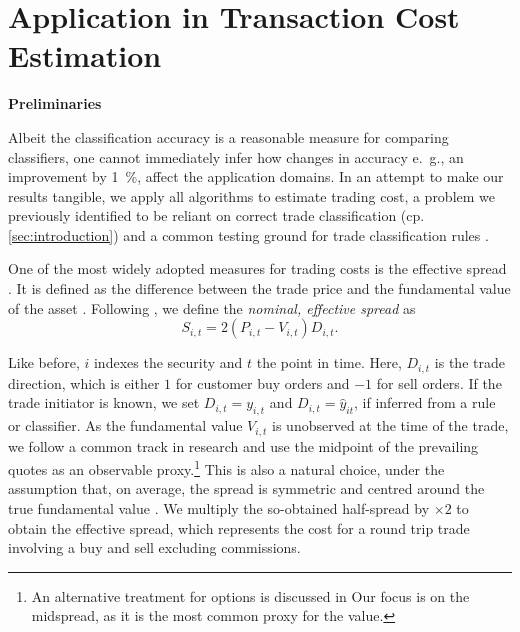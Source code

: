 \clearpage

\section{Application in Transaction Cost Estimation}\label{sec:application}

\textbf{Preliminaries}

Albeit the classification accuracy is a reasonable measure for comparing classifiers, one cannot immediately infer how changes in accuracy e.~g., an improvement by \SI{1}{\percent}, affect the application domains. In an attempt to make our results tangible, we apply all algorithms to estimate trading cost, a problem we previously identified to be reliant on correct trade classification (cp. \cref{sec:introduction}) and a common testing ground for trade classification rules \autocites[cp.][541]{ellisAccuracyTradeClassification2000}[][569]{finucaneDirectTestMethods2000}[][271--278]{petersonEvaluationBiasesExecution2003}[][896--897]{savickasInferringDirectionOption2003}.

One of the most widely adopted measures for trading costs is the effective spread \autocite[][112]{Piwowar_2006}. It is defined as the difference between the trade price and the fundamental value of the asset \autocite[][238--239]{bessembinderIssuesAssessingTrade2003}. Following \textcite[][238--239]{bessembinderIssuesAssessingTrade2003}, we define the \emph{nominal, effective spread} as
\begin{equation}
    S_{i,t} = 2 (P_{i,t} - V_{i,t}) D_{i,t}.
    \label{eq:effective-spread}
\end{equation}

Like before, $i$ indexes the security and $t$ the point in time. Here, $D_{i,t}$ is the trade direction, which is either $1$ for customer buy orders and $-1$ for sell orders. If the trade initiator is known, we set $D_{i,t} = y_{i,t}$ and $D_{i,t}=\hat{y}_{it}$, if inferred from a rule or classifier. As the fundamental value $V_{i,t}$ is unobserved at the time of the trade, we follow a common track in research and use the midpoint of the prevailing quotes as an observable proxy.\footnote{An alternative treatment for options is discussed in \textcite[][4975--4976]{muravyevOptionsTradingCosts2020} Our focus is on the midspread, as it is the most common proxy for the value.} This is also a natural choice, under the assumption that, on average, the spread is symmetric and centred around the true fundamental value \autocite[][1018]{leeMarketIntegrationPrice1993}. We multiply the so-obtained half-spread by $\times 2$ to obtain the effective spread, which represents the cost for a round trip trade involving a buy and sell excluding commissions.

